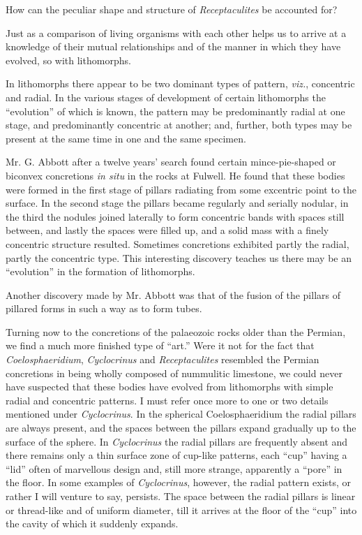 \documentclass[a4paper, 12pt, oneside]{article}
\begin{document}
How can the peculiar shape and structure of \emph{Receptaculites} be accounted for?

Just as a comparison of living organisms with each other helps us to arrive at a knowledge of their mutual relationships and of the manner in which they have evolved, so with lithomorphs.

In lithomorphs there appear to be two dominant types of pattern, \emph{viz.}, concentric and radial. In the various stages of development of certain lithomorphs the ``evolution'' of which is known, the pattern may be predominantly radial at one stage, and predominantly concentric at another; and, further, both types may be present at the same time in one and the same specimen.

Mr. G. Abbott after a twelve years' search found certain mince-pie-shaped or biconvex concretions \emph{in situ} in the rocks at Fulwell. He found that these bodies were formed in the first stage of pillars radiating from some excentric point to the surface. In the second stage the pillars became regularly and serially nodular, in the third the nodules joined laterally to form concentric bands with spaces still between, and lastly the spaces were filled up, and a solid mass with a finely concentric structure resulted. Sometimes concretions exhibited partly the radial, partly the concentric type. This interesting discovery teaches us there may be an ``evolution'' in the formation of lithomorphs.

Another discovery made by Mr. Abbott was that of the fusion of the pillars of pillared forms in such a way as to form tubes.

Turning now to the concretions of the palaeozoic rocks older than the Permian, we find a much more finished type of ``art.'' Were it not for the fact that \emph{Coelosphaeridium}, \emph{Cyclocrinus} and \emph{Receptaculites} resembled the Permian concretions in being wholly composed of nummulitic limestone, we could never have suspected that these bodies have evolved from lithomorphs with simple radial and concentric patterns. I must refer once more to one or two details mentioned under \emph{Cyclocrinus}. In the spherical Coelosphaeridium the radial pillars are always present, and the spaces between the pillars expand gradually up to the surface of the sphere. In \emph{Cyclocrinus} the radial pillars are frequently absent and there remains only a thin surface zone of cup-like patterns, each ``cup'' having a ``lid'' often of marvellous design and, still more strange, apparently a ``pore'' in the floor. In some examples of \emph{Cyclocrinus}, however, the radial pattern exists, or rather I will venture to say, persists. The space between the radial pillars is linear or thread-like and of uniform diameter, till it arrives at the floor of the ``cup'' into the cavity of which it suddenly expands.
\end{document}
